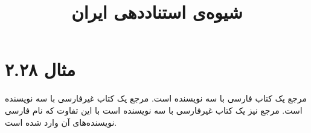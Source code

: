 \documentclass[a4paper,10pt]{article}
\def\examplenumber{مثال ۲.۲۸}
\begin{document}
\title{شیوه‌ی استناددهی ایران}
\author{}
\date{}
\maketitle



\section*{\examplenumber}

مرجع \cite{صارمی1372} یک کتاب فارسی با سه نویسنده است. مرجع \cite{merk1987} یک کتاب غیرفارسی با سه نویسنده است. مرجع \cite{salmon2009} نیز یک کتاب غیرفارسی با سه نویسنده است با این تفاوت که نام فارسی نویسنده‌های آن وارد شده است.






\end{document}
